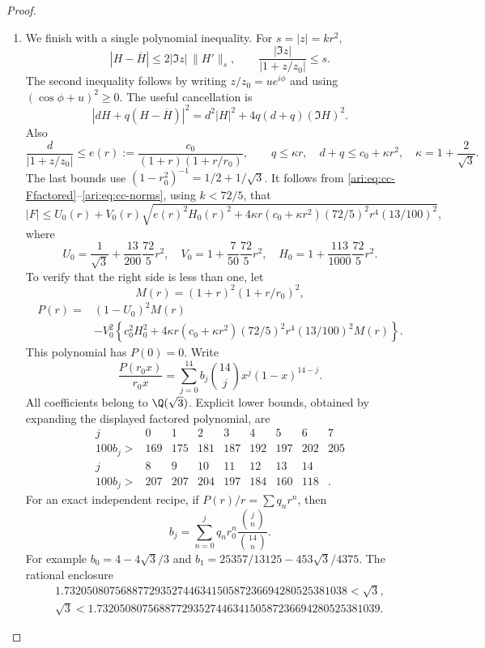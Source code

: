 \begin{proof}
\begin{enumerate}[label=\arabic*.,leftmargin=*]
\item We finish with a single polynomial inequality. For $s=|z|=kr^2$,
\[
 |H-\overline H|\le2|\Im z|\,\|H'\|_s,\qquad
 \frac{|\Im z|}{|1+z/z_0|}\le s.
\]
The second inequality follows by writing $z/z_0=ue^{i\phi}$
and using $(\cos\phi+u)^2\ge0$. The useful cancellation is
\[
 |dH+q(H-\overline H)|^2
      =d^2|H|^2+4q(d+q)(\Im H)^2.
\]
Also
\[
 \frac d{|1+z/z_0|}\le
 e(r):=\frac{c_0}{(1+r)(1+r/r_0)},\qquad
 q\le\kappa r,\quad d+q\le c_0+\kappa r^2,
 \quad\kappa=1+\frac2{\sqrt3}.
\]
The last bounds use $(1-r_0^2)^{-1}=1/2+1/\sqrt3$.
It follows from \eqref{ari:eq:cc-Ffactored}--\eqref{ari:eq:cc-norms},
using $k<72/5$, that
\begin{equation}\label{ari:eq:cc-scalar}
 |F|\le U_0(r)+V_0(r)
 \sqrt{e(r)^2H_0(r)^2+
       4\kappa r(c_0+\kappa r^2)(72/5)^2r^4(13/100)^2},
\end{equation}
where
\[
 U_0=\frac1{\sqrt3}+\frac{13}{200}\frac{72}{5}r^2,
 \quad V_0=1+\frac7{50}\frac{72}{5}r^2,
 \quad H_0=1+\frac{113}{1000}\frac{72}{5}r^2.
\]
To verify that the right side is less than one, let
\[
 M(r)=(1+r)^2(1+r/r_0)^2,
\]
\begin{equation}\label{ari:eq:cc-P}
 \begin{aligned}
 P(r)={}&(1-U_0)^2M(r)\\
 &-V_0^2\left\{c_0^2H_0^2+
 4\kappa r(c_0+\kappa r^2)(72/5)^2r^4(13/100)^2M(r)\right\}.
 \end{aligned}
\end{equation}
This polynomial has $P(0)=0$. Write
\[
 \frac{P(r_0x)}{r_0x}
     =\sum_{j=0}^{14}b_j\binom{14}{j}x^j(1-x)^{14-j}.
\]
All coefficients belong to $\Q(\sqrt3)$. Explicit lower bounds,
obtained by expanding the displayed factored polynomial, are
\[
 \begin{array}{c|rrrrrrrr}
 j&0&1&2&3&4&5&6&7\\ \hline
 100b_j>&169&175&181&187&192&197&202&205\\[2pt]
 j&8&9&10&11&12&13&14&\\ \hline
 100b_j>&207&207&204&197&184&160&118&.
 \end{array}
\]
For an exact independent recipe, if $P(r)/r=\sum q_nr^n$,
then
\[
 b_j=\sum_{n=0}^j q_nr_0^n
                  \frac{\binom jn}{\binom{14}n}.
\]
For example $b_0=4-4\sqrt3/3$ and
$b_1=25357/13125-453\sqrt3/4375$. The rational enclosure
\[
 \begin{gathered}
 1.73205080756887729352744634150587236694280525381038<\sqrt3,\\
 \sqrt3<1.73205080756887729352744634150587236694280525381039.

\end{gathered}\]
\end{enumerate}
\end{proof}
